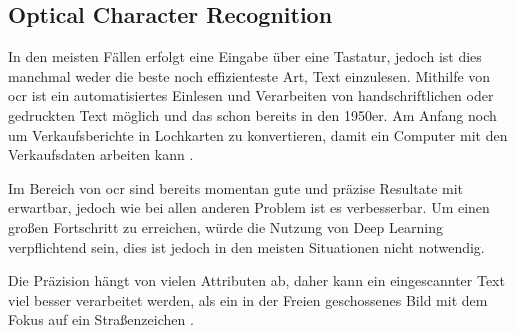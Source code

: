 \subsection{Optical Character Recognition}

In den meisten Fällen erfolgt eine Eingabe über eine Tastatur, jedoch ist dies manchmal weder die beste noch effizienteste Art, Text einzulesen. Mithilfe von \gls{ocr} ist ein automatisiertes Einlesen und Verarbeiten von handschriftlichen oder gedruckten Text möglich und das schon bereits in den 1950er. Am Anfang noch um Verkaufsberichte in Lochkarten zu konvertieren, damit ein Computer mit den Verkaufsdaten arbeiten kann \cite{OCR:online}.

Im Bereich von \gls{ocr} sind bereits momentan gute und präzise Resultate mit  erwartbar, jedoch wie bei allen anderen Problem ist es verbesserbar. Um einen großen Fortschritt zu erreichen, würde die Nutzung von Deep Learning verpflichtend sein, dies ist jedoch in den meisten Situationen nicht notwendig.

Die Präzision hängt von vielen Attributen ab, daher kann ein eingescannter Text viel besser verarbeitet werden, als ein in der Freien geschossenes Bild mit dem Fokus auf ein Straßenzeichen \cite{OCR2:online}.


